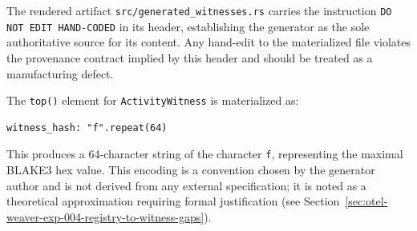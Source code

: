 The rendered artifact \texttt{src/generated\_witnesses.rs} carries the instruction
\texttt{DO NOT EDIT HAND-CODED} in its header, establishing the generator as the sole
authoritative source for its content. Any hand-edit to the materialized file violates the
provenance contract implied by this header and should be treated as a manufacturing defect.

The \texttt{top()} element for \texttt{ActivityWitness} is materialized as:
\begin{verbatim}
witness_hash: "f".repeat(64)
\end{verbatim}
This produces a 64-character string of the character \texttt{f}, representing the maximal
BLAKE3 hex value. This encoding is a convention chosen by the generator author and is not
derived from any external specification; it is noted as a theoretical approximation
requiring formal justification (see Section~\ref{sec:otel-weaver-exp-004-registry-to-witness-gaps}).
